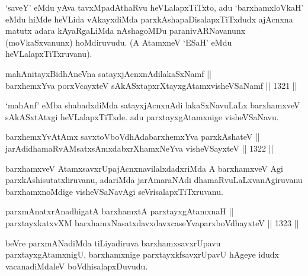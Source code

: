 \begin{artha}
`saveY' eMdu yAva tavxMpadAthaRvu heVLalapxTiTxto, adu `barxhamxloVkaH' eMdu hiMde heVLida vAkayxdiMda parxkAshapaDisalapxTiTxdudx ajAcnxna matutx adara kAyaRgaLiMda nAshagoMDu paranivARNavanunx (moVkaSxvanunx) hoMdiruvudu. (A AtamxneV `ESaH' eMdu heVLalapxTiTxruvanu).
\end{artha}

\begin{shl}
mahAnitayxBidhAneVna satayxjAcnxnAdilakaSxNamf ||  \\
barxhemxYva porxVcayxteV sAkASxtapxrXtayxgAtamxvisheVSaNamf \hfill || 1321 ||  
\end{shl}

\begin{artha}
`mahAnf' eMba shabadxdiMda satayxjAcnxnAdi lakaSxNavuLaLx barxhamxveV sAkASxtAtxgi heVLalapxTiTxde. adu parxtayxgAtamxnige visheVSaNavu.
\end{artha}


\begin{shl}
barxhemxYvA\s \s tAmx savxtoV\s boVdhAdabarxhemxYva parxkAshateV || \\
jarAdidhamaRvAMsatxsAmxdabxrXhamxNeYva visheVSayxteV \hfill || 1322 ||  
\end{shl}

\begin{artha}
barxhamxveV AtamxsavxrUpajAcnxnavilalxdadxriMda A barxhamxveV Agi parxkAshisutatxliruvanu, adariMda jarAmaraNAdi dhamaRvuLaLxvanAgiruvanu barxhamxnoMdige visheVSaNavAgi seVrisalapxTiTxruvanu.
\end{artha}


\begin{shl}
parxmAnatxrAnadhigatA barxhamxtA parxtayxgAtamxnaH || \\
parxtayxkatxvXM barxhamxNasatxdavxdavxcaseYva\footnotemark[1] parxboVdhayxteV \hfill || 1323 ||  
\end{shl}

\begin{artha}
beVre parxmANadiMda tiLiyadiruva barxhamxsavxrUpavu parxtayxgAtamxnigU, barxhamxnige parxtayxkfsavxrUpavU hAgeye idudx vacanadiMdaleV boVdhisalapxDuvudu.
\end{artha}

